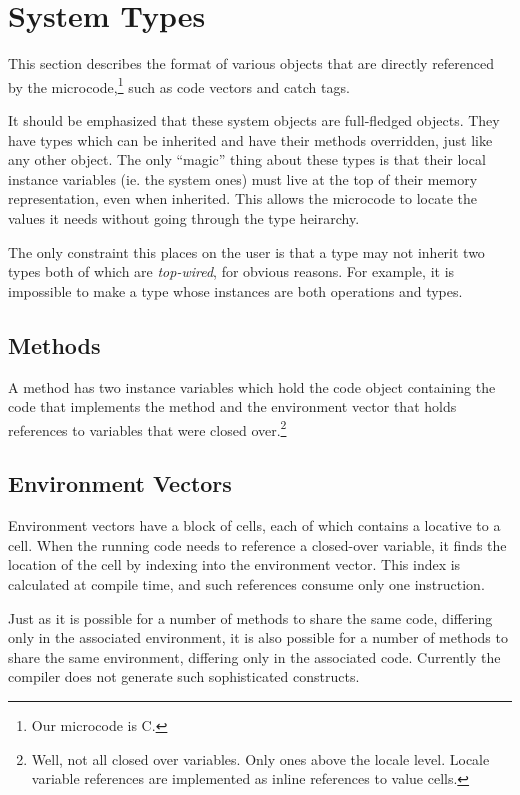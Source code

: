 \section{System Types}

This section describes the format of various objects that are directly
referenced by the microcode,\footnote{Our microcode is C.} such as
code vectors and catch tags.

It should be emphasized that these system objects are full-fledged objects.
They have types which can be inherited and have their methods overridden,
just like any other object.  The only ``magic'' thing about these types is
that their local instance variables (ie. the system ones) must live at the
top of their memory representation, even when inherited.  This allows the
microcode to locate the values it needs without going through the type
heirarchy.

The only constraint this places on the user is that a type may not inherit
two types both of which are \emph{top-wired}, for obvious reasons.  For
example, it is impossible to make a type whose instances are both
operations and types.

\subsection{Methods}

A method has two instance variables which hold the code object
containing the code that implements the method and the environment
vector that holds references to variables that were closed
over.\footnote{Well, not all closed over variables.  Only ones above
the locale level.  Locale variable references are implemented as
inline references to value cells.}

\subsection{Environment Vectors}

Environment vectors have a block of cells, each of which contains a
locative to a cell.  When the running code needs to reference a
closed-over variable, it finds the location of the cell by indexing into
the environment vector.  This index is calculated at compile time, and such
references consume only one instruction.

Just as it is possible for a number of methods to share the same code,
differing only in the associated environment, it is also possible for
a number of methods to share the same environment, differing only in
the associated code.  Currently the compiler does not generate such
sophisticated constructs.

